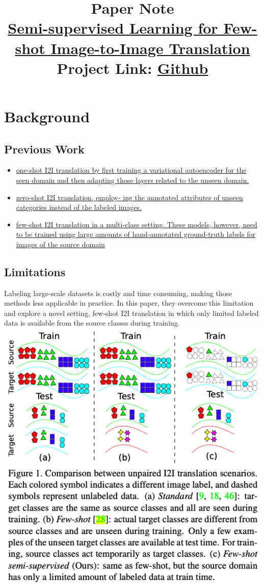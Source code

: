\documentclass[10pt]{article}
\title{
    {\normalsize Paper Note} \\
    {\large \href{https://openaccess.thecvf.com/content_CVPR_2020/papers/Wang_Semi-Supervised_Learning_for_Few-Shot_Image-to-Image_Translation_CVPR_2020_paper.pdf}{Semi-supervised Learning for Few-shot Image-to-Image Translation
    }} \\
    {\normalsize Project Link: \href{https://github.com/yaxingwang/SEMIT}{Github}}
}
\begin{document}
    \maketitle

    \section{Background}
        \subsection*{Previous Work}
            \begin{itemize}
                \item \href{https://arxiv.org/pdf/1806.06029.pdf}{one-shot I2I translation by first training a variational autoencoder for the seen domain and then adapting those layers related to the unseen domain.}
                \item \href{https://arxiv.org/pdf/1906.00184.pdf}{zero-shot I2I translation, employ- ing the annotated attributes of unseen categories instead of the labeled images.}
                \item \href{https://arxiv.org/pdf/1905.01723.pdf}{few-shot I2I translation in a multi-class setting. These models, however, need to be trained using large amounts of hand-annotated ground-truth labels for images of the source domain}
            \end{itemize} 

        \subsection*{Limitations}
            Labeling large-scale datasets is costly and time consuming, making those methods less applicable in practice. 
            In this paper, they overcome this limitation and explore a novel setting, few-shot I2I translation
            in which only limited labeled data is available from the source classes during training. \\
        
            \includegraphics[width=\linewidth]{src/img/Comparison between unpaired I2I translation scenarios.png} \\
\end{document}
